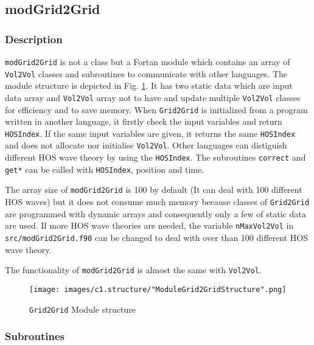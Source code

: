 \pagebreak
\subsection{modGrid2Grid}

\subsubsection{Description}

\texttt{modGrid2Grid} is not a class but a Fortan module which contains an array of \texttt{Vol2Vol} classes and subroutines to communicate with other languages. The module structure is depicted in Fig. \ref{fig:modGrid2GridStructure}. It has two static data which are input data array and \texttt{Vol2Vol} array not to have and update multiple \texttt{Vol2Vol} classes for efficiency and to save memory. When \texttt{Grid2Grid} is initialized from a program written in another language, it firstly check the input variables and return \texttt{HOSIndex}. If the same input variables are given, it returns the same \texttt{HOSIndex} and does not allocate nor initialise \texttt{Vol2Vol}. Other languages can distiguish different HOS wave theory by using the \texttt{HOSIndex}.
The subroutines \texttt{correct} and \texttt{get*} can be called with \texttt{HOSIndex}, position and time. 

The array size of \texttt{modGrid2Grid} is 100 by default (It can deal with 100 different HOS waves) but it does not consume much memory because classes of \texttt{Grid2Grid} are programmed with dynamic arrays and consequently only a few of static data are used. If more HOS wave theories are needed, the variable \texttt{nMaxVol2Vol} in \texttt{src/modGrid2Grid.f90} can be changed to deal with over than 100 different HOS wave theory. 

The functionality of \texttt{modGrid2Grid} is almost the same with \texttt{Vol2Vol}. 

\vspace{0.5cm}

{
	\begin{figure} [H]
		\centering
		\texttt{[image: images/c1.structure/"ModuleGrid2GridStructure".png]}
		\vspace{0.5cm}
		\caption{\texttt{Grid2Grid} Module structure}
		\label{fig:modGrid2GridStructure}
	\end{figure}
}

\subsubsection{Subroutines}	

